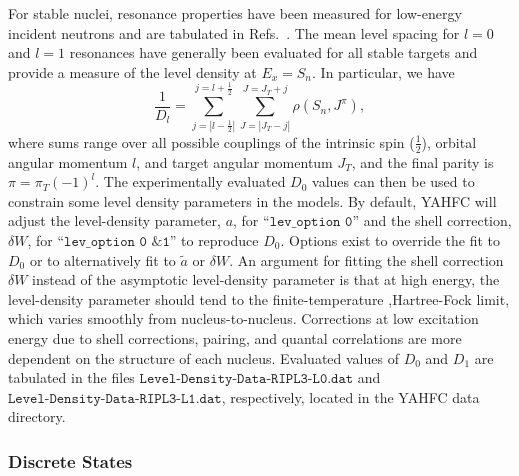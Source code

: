 \documentclass[
10pt,
showpacs,preprintnumbers,footinbib,
amsfonts,amsmath,amssymb,
aps,
prc,twocolumn,groupedaddress,superscriptaddress,
showkeys,
nofootinbib
]{revtex4-1}
\begin{document}
For stable nuclei, resonance properties have been measured for low-energy incident neutrons and are tabulated in Refs.~\cite{Mughabghab-1:2018,Mughabghab-2:2018}. The mean level spacing for $l=0$ and $l=1$ resonances have generally been evaluated for all stable targets and provide a measure of the level density at $E_x=S_n$. In particular, we have
\begin{equation}
\frac{1}{D_l} = \sum_{j=|l-\frac{1}{2}|}^{j=l+\frac{1}{2}}\sum_{J=|J_T-j|}^{J=J_T+j} \rho(S_n,J^\pi),
\end{equation}
where sums range over all possible couplings of the intrinsic spin ($\frac{1}{2}$), orbital angular momentum $l$, and target angular momentum $J_T$, and the final parity is $\pi = \pi_T(-1)^l$. The experimentally evaluated $D_0$ values can then be used to constrain some level density parameters in the models. 
By default, YAHFC will adjust the level-density parameter,
$a$, for ``${\texttt{lev\_option 0}}$'' and the shell correction, $\delta W$,
for ``${\texttt{lev\_option 0 \& 1}}$'' to reproduce $D_0$. Options exist
to override the fit to $D_0$ or to alternatively fit to $\tilde a$ or $\delta W$.  An argument for fitting the shell correction $\delta W$ instead of the asymptotic level-density parameter is that at high energy, the level-density parameter should tend to the finite-temperature ,Hartree-Fock limit, which varies smoothly from nucleus-to-nucleus. Corrections at low excitation energy due to shell corrections, pairing, and quantal correlations are more dependent on the structure of each nucleus. Evaluated values of $D_0$ and $D_1$ are tabulated in the files ${\texttt{Level-Density-Data-RIPL3-L0.dat}}$ and ${\texttt{Level-Density-Data-RIPL3-L1.dat}}$, respectively, located in the YAHFC data directory.

\subsubsection{Discrete States}
\end{document}

